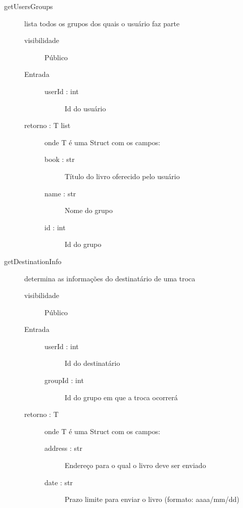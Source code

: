 \documentclass[a4paper]{article}
\begin{document}
\begin{description}
\begin{description}
			\end{description}
			
			\item [getUsersGroups] lista todos os grupos dos quais o usuário faz parte
			\begin{description} %
			 \item [visibilidade] Público
			 \item [Entrada] \mbox{}
				\begin{description} %
				 \item [userId : int] Id do usuário
				\end{description} %
				
			 \item [retorno : T list ] onde T é uma Struct com os campos:
				\begin{description} %
				 \item [book : str] Título do livro oferecido pelo usuário
				 \item [name : str] Nome do grupo
				 \item [id : int] Id do grupo
				\end{description} %
				
			\end{description} %
			
			\item [getDestinationInfo] determina as informações do destinatário de uma troca 
			\begin{description} %
			 \item [visibilidade] Público
			 \item [Entrada] \mbox{}
				\begin{description} %
				 \item [userId : int] Id do destinatário
				 \item [groupId : int] Id do grupo em que a troca ocorrerá
				\end{description} %
				
			 \item [retorno : T ] onde T é uma Struct com os campos:
				\begin{description} %
				 \item [address : str] Endereço para o qual o livro deve ser enviado
				 \item [date : str] Prazo limite para enviar o livro (formato: aaaa/mm/dd)
				\end{description} %
				

\end{description}
\end{description}
\end{document}

